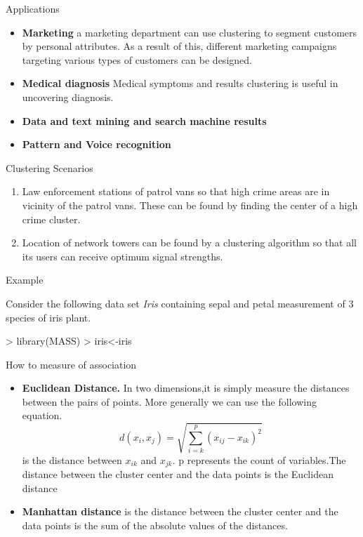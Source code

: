 \documentclass[10pt]{beamer}
\begin{document}
\begin{frame}[fragile]{Applications}
\begin{itemize}
\item \textbf{Marketing} a marketing department can use clustering to segment customers by personal attributes. As a result of this, different marketing campaigns targeting various types of customers can be designed.
\item \textbf{Medical diagnosis} Medical symptoms and results clustering is useful in uncovering diagnosis.
\item \textbf{Data and text mining and search machine results}
\item \textbf{Pattern and Voice recognition}
\end{itemize}
\begin{block}{Clustering Scenarios}
\begin{enumerate}
\item Law enforcement stations of patrol vans so that high crime areas are in vicinity of the patrol vans. These can be found by finding the center of a high crime cluster.
\item Location of network towers can be found by a clustering algorithm so that all its users can receive optimum signal strengths.
\end{enumerate}
\end{block}
\end{frame}

\begin{frame}[fragile]{Example}
\begin{block}{}
Consider the following data set \textit{Iris} containing sepal and petal measurement of 3 species of iris plant.
\begin{Schunk}
\begin{Sinput}
> library(MASS)
> iris<-iris
\end{Sinput}
\end{Schunk}
\end{block}
\begin{block}{How to  measure of association}
\begin{itemize}
\item \textbf{Euclidean Distance.} In two dimensions,it is simply measure the distances between the pairs of points. More generally we can use the following equation. $$ d(x_{i},x_{j})=\sqrt{\sum_{i=k}^p(x_{ij}-x_{ik})^2}$$ is the distance between $x_{ik}$ and $x_{jk}$. p represents the count of variables.The distance between the cluster center and the data points is the Euclidean distance
\item \textbf{Manhattan distance} is the distance between the cluster center and the data points is the sum of the absolute values of the distances.
\end{itemize}
\end{block}
\end{frame}
\end{document}
